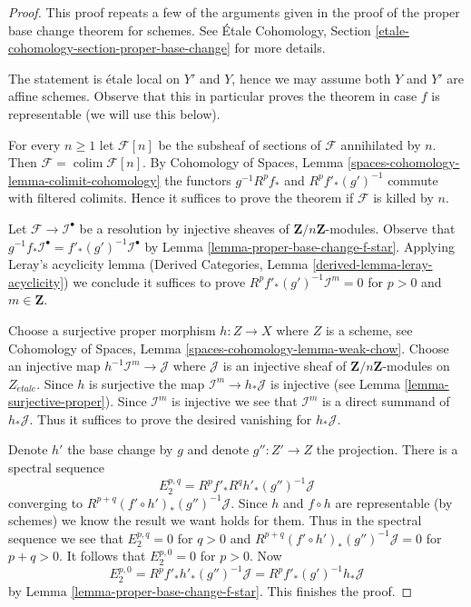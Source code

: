 \documentclass{stacks-project}
\theoremstyle{plain}
\theoremstyle{definition}
\theoremstyle{remark}
\numberwithin{equation}{subsection}
\def\colim{\mathop{\mathrm{colim}}\nolimits}
\def\etale{{\acute{e}tale}}
\begin{document}
\begin{proof}
This proof repeats a few of the arguments given in the proof of the
proper base change theorem for schemes. See
\'Etale Cohomology, Section \ref{etale-cohomology-section-proper-base-change}
for more details.

\medskip\noindent
The statement is \'etale local on $Y'$ and $Y$, hence we may assume
both $Y$ and $Y'$ are affine schemes. Observe that this in particular
proves the theorem in case $f$ is representable (we will use this
below).

\medskip\noindent
For every $n \geq 1$ let $\mathcal{F}[n]$ be the subsheaf of sections
of $\mathcal{F}$ annihilated by $n$. Then
$\mathcal{F} = \colim \mathcal{F}[n]$. By 
Cohomology of Spaces, Lemma \ref{spaces-cohomology-lemma-colimit-cohomology}
the functors $g^{-1}R^pf_*$ and $R^pf'_*(g')^{-1}$ commute
with filtered colimits. Hence it suffices to prove the theorem
if $\mathcal{F}$ is killed by $n$.

\medskip\noindent
Let $\mathcal{F} \to \mathcal{I}^\bullet$ be a resolution by
injective sheaves of $\mathbf{Z}/n\mathbf{Z}$-modules.
Observe that
$g^{-1}f_*\mathcal{I}^\bullet = f'_*(g')^{-1}\mathcal{I}^\bullet$
by Lemma \ref{lemma-proper-base-change-f-star}.
Applying Leray's acyclicity lemma
(Derived Categories, Lemma \ref{derived-lemma-leray-acyclicity})
we conclude it suffices to prove
$R^pf'_*(g')^{-1}\mathcal{I}^m = 0$ for $p > 0$ and $m \in \mathbf{Z}$.

\medskip\noindent
Choose a surjective proper morphism
$h : Z \to X$ where $Z$ is a scheme, see
Cohomology of Spaces, Lemma \ref{spaces-cohomology-lemma-weak-chow}.
Choose an injective map $h^{-1}\mathcal{I}^m \to \mathcal{J}$
where $\mathcal{J}$ is an injective sheaf of
$\mathbf{Z}/n\mathbf{Z}$-modules on $Z_\etale$.
Since $h$ is surjective the map $\mathcal{I}^m \to h_*\mathcal{J}$
is injective (see Lemma \ref{lemma-surjective-proper}).
Since $\mathcal{I}^m$ is injective we see that $\mathcal{I}^m$
is a direct summand of $h_*\mathcal{J}$. Thus it suffices
to prove the desired vanishing for $h_*\mathcal{J}$.

\medskip\noindent
Denote $h'$ the base change by $g$ and denote $g'' : Z' \to Z$
the projection. There is a spectral sequence
$$
E_2^{p, q} = R^pf'_* R^qh'_* (g'')^{-1}\mathcal{J}
$$
converging to $R^{p + q}(f' \circ h')_*(g'')^{-1}\mathcal{J}$.
Since $h$ and $f \circ h$ are representable (by schemes)
we know the result we want holds for them. Thus in the
spectral sequence we see that $E_2^{p, q} = 0$ for $q > 0$
and $R^{p + q}(f' \circ h')_*(g'')^{-1}\mathcal{J} = 0$
for $p + q > 0$. It follows that $E_2^{p, 0} = 0$ for $p > 0$.
Now
$$
E_2^{p, 0} = R^pf'_* h'_* (g'')^{-1}\mathcal{J} =
R^pf'_* (g')^{-1}h_*\mathcal{J}
$$
by Lemma \ref{lemma-proper-base-change-f-star}. This finishes the proof.
\end{proof}
\end{document}
